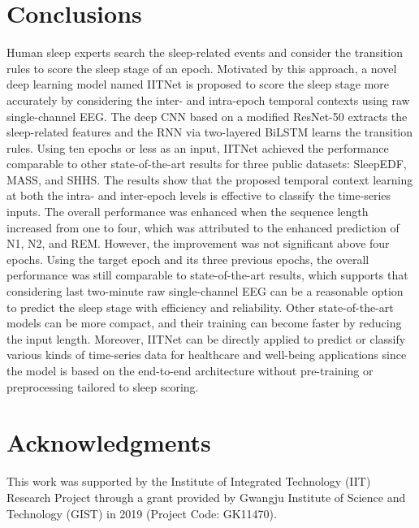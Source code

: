 \documentclass[10pt,twocolumn,twoside]{IEEEtran}
\begin{document}
   
	\section{Conclusions}
	\label{sec:conclusions}
	
	Human sleep experts search the sleep-related events and consider the transition rules to score the sleep stage of an epoch. Motivated by this approach, a novel deep learning model named IITNet is proposed to score the sleep stage more accurately by considering the inter- and intra-epoch temporal contexts using raw single-channel EEG. The deep CNN based on a modified ResNet-50 extracts the sleep-related features and the RNN via two-layered BiLSTM learns the transition rules. Using ten epochs or less as an input, IITNet achieved the performance comparable to other state-of-the-art results for three public datasets: SleepEDF, MASS, and SHHS. The results show that the proposed temporal context learning at both the intra- and inter-epoch levels is effective to classify the time-series inputs. The overall performance was enhanced when the sequence length increased from one to four, which was attributed to the enhanced prediction of N1, N2, and REM.	However, the improvement was not significant above four epochs. Using the target epoch and its three previous epochs, the overall performance was still comparable to state-of-the-art results, which supports that considering last two-minute raw single-channel EEG can be a reasonable option to predict the sleep stage with efficiency and reliability. Other state-of-the-art models can be more compact, and their training can become faster by reducing the input length. Moreover, IITNet can be directly applied to predict or classify various kinds of time-series data for healthcare and well-being applications since the model is based on the end-to-end architecture without pre-training or preprocessing tailored to sleep scoring. 
	
\section*{Acknowledgments}
    This work was supported by the Institute of Integrated Technology (IIT) Research Project through a grant provided by Gwangju Institute of Science and Technology (GIST) in 2019 (Project Code: GK11470).
	
\ifCLASSOPTIONcaptionsoff
	\newpage
	\fi

	




{}
    
	






















	
	


	
	
	
	
\end{document}
